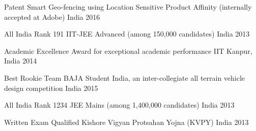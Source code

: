 
\begin{cvhonors}
	\cvhonor
	{Patent} %
	{Smart Geo-fencing using Location Sensitive Product Affinity (internally accepted at Adobe)} %
	{India} %
	{2016} %
	
	\cvhonor
	{All India Rank 191 } %
	{IIT-JEE Advanced (among 150,000 candidates)} %
	{India} %
	{2013} %
	
	\cvhonor
	{Academic Excellence Award} %
	{for exceptional academic performance} %
	{IIT Kanpur, India} %
	{2014} %
	
	\cvhonor
	{Best Rookie Team} %
	{BAJA Student India, an inter-collegiate all terrain vehicle design competition} %
	{India} %
	{2015} %
	
	\cvhonor
	{All India Rank 1234} %
	{JEE Mains (among 1,400,000 candidates)} %
	{India} %
	{2013} %
	
	\cvhonor
	{Written Exam Qualified} %
	{Kishore Vigyan Protsahan Yojna (KVPY)} %
	{India} %
	{2013} %
	
\end{cvhonors}